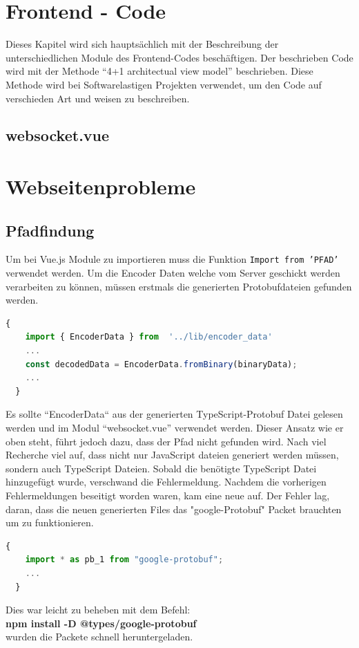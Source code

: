 \section{Frontend - Code}
\label{subsec:frontend_Code}
Dieses Kapitel wird sich hauptsächlich mit der Beschreibung der unterschiedlichen Module des
Frontend-Codes beschäftigen. Der beschrieben Code wird mit der Methode ``4+1 architectual view model'' beschrieben.
%
Diese Methode wird bei Softwarelastigen Projekten verwendet,
um den Code auf verschieden Art und weisen zu beschreiben. 

\subsection{websocket.vue}
\label{subsec:frontend_websocket.vue}

\section{Webseitenprobleme}
\label{subsec:problem_Webseite}

\subsection{Pfadfindung}
\label{subsubsec:problem_Pfadfindung}
Um bei Vue.js Module zu importieren muss die Funktion \texttt{Import from 'PFAD'} verwendet werden.
%
Um die Encoder Daten welche vom Server geschickt werden verarbeiten zu können, 
müssen erstmals die generierten Protobufdateien gefunden werden.
%
\begin{lstlisting}[language=JavaScript,gobble=4]
  {
    import { EncoderData } from  '../lib/encoder_data'
    ...
    const decodedData = EncoderData.fromBinary(binaryData);
    ...
  }
\end{lstlisting}
Es sollte ``EncoderData`` aus der generierten TypeScript-Protobuf Datei gelesen werden und im Modul ``websocket.vue'' verwendet werden.
Dieser Ansatz wie er oben steht, führt jedoch dazu, dass der Pfad nicht gefunden wird. 
%
Nach viel Recherche viel auf, dass nicht nur JavaScript dateien generiert werden müssen, sondern auch TypeScript Dateien.
Sobald die benötigte TypeScript Datei hinzugefügt wurde, verschwand die Fehlermeldung.
%
Nachdem die vorherigen Fehlermeldungen beseitigt worden waren, kam eine neue auf. 
Der Fehler lag, daran, dass die neuen generierten Files das "google-Protobuf" Packet brauchten um zu funktionieren.
% 
\begin{lstlisting}[language=JavaScript,gobble=4]
  {
    import * as pb_1 from "google-protobuf";
    ...
  }
\end{lstlisting}
Dies war leicht zu beheben mit dem Befehl:\\ \textbf{npm install -D @types/google-protobuf} \\ wurden die Packete schnell
heruntergeladen.
